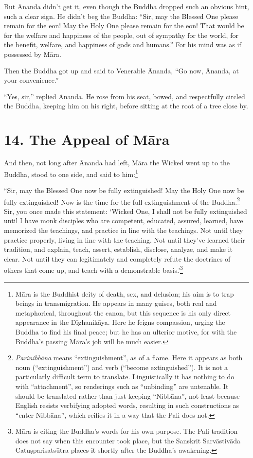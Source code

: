 \documentclass[12pt,openany]{book}%
\begin{document}
But Ānanda didn’t get it, even though the Buddha dropped such an obvious hint, such a clear sign. He didn’t beg the Buddha: “Sir, may the Blessed One please remain for the eon! May the Holy One please remain for the eon! That would be for the welfare and happiness of the people, out of sympathy for the world, for the benefit, welfare, and happiness of gods and humans.” For his mind was as if possessed by \textsanskrit{Māra}. 

Then the Buddha got up and said to Venerable Ānanda, “Go now, Ānanda, at your convenience.” 

“Yes, sir,” replied Ānanda. He rose from his seat, bowed, and respectfully circled the Buddha, keeping him on his right, before sitting at the root of a tree close by. 

\section*{14. The Appeal of \textsanskrit{Māra} }

And then, not long after Ānanda had left, \textsanskrit{Māra} the Wicked went up to the Buddha, stood to one side, and said to him:\footnote{\textsanskrit{Māra} is the Buddhist deity of death, sex, and delusion; his aim is to trap beings in transmigration. He appears in many guises, both real and metaphorical, throughout the canon, but this sequence is his only direct appearance in the \textsanskrit{Dīghanikāya}. Here he feigns compassion, urging the Buddha to find his final peace; but he has an ulterior motive, for with the Buddha’s passing \textsanskrit{Māra}’s job will be much easier. } 

“Sir, may the Blessed One now be fully extinguished! May the Holy One now be fully extinguished! Now is the time for the full extinguishment of the Buddha.\footnote{\textit{\textsanskrit{Parinibbāna}} means “extinguishment”, as of a flame. Here it appears as both noun (“extinguishment”) and verb (“become extinguished”). It is not a particularly difficult term to translate. Linguistically it has nothing to do with “attachment”, so renderings such as “unbinding” are untenable. It should be translated rather than just keeping “\textsanskrit{Nibbāna}”, not least because English resists verbifying adopted words, resulting in such constructions as “enter \textsanskrit{Nibbāna}”, which reifies it in a way that the Pali does not. } Sir, you once made this statement: ‘Wicked One, I shall not be fully extinguished until I have monk disciples who are competent, educated, assured, learned, have memorized the teachings, and practice in line with the teachings. Not until they practice properly, living in line with the teaching. Not until they’ve learned their tradition, and explain, teach, assert, establish, disclose, analyze, and make it clear. Not until they can legitimately and completely refute the doctrines of others that come up, and teach with a demonstrable basis.’\footnote{\textsanskrit{Māra} is citing the Buddha’s words for his own purpose. The Pali tradition does not say when this encounter took place, but the Sanskrit \textsanskrit{Sarvāstivāda} \textsanskrit{Catuṣparisatsūtra} places it shortly after the Buddha’s awakening. } 
\end{document}
